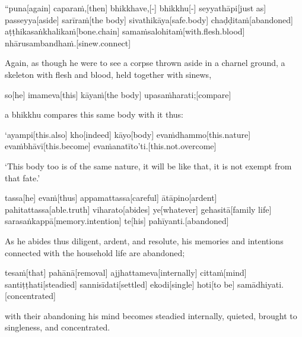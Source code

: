 \vskip 0.05in
\begin{samepage}
\begingl[glneveryline={\PaliGlossA,\PaliGlossB}]
“puna[again] caparaṁ,[then] bhikkhave,[-] bhikkhu[-] seyyathāpi[just as] passeyya[aside] sarīraṁ[the body] sivathikāya[safe.body] chaḍḍitaṁ[abandoned] aṭṭhikasaṅkhalikaṁ[bone.chain] samaṁsalohitaṁ[with.flesh.blood] nhārusambandhaṁ.[sinew.connect]
\endgl
\nopagebreak
\linespread{0.5}
\begin{spacin}{0.2}
{\PaliGlossFT Again, as though he were to see a corpse thrown aside in a charnel ground, a skeleton with flesh and blood, held together with sinews,}
\end{spacin}
\vskip 12pt
\end{samepage}
\begin{samepage}
\begingl[glneveryline={\PaliGlossA,\PaliGlossB}]
so[he] imameva[this] kāyaṁ[the body] upasaṁharati;[compare]
\endgl
\nopagebreak
\linespread{0.5}
\begin{spacin}{0.2}
{\PaliGlossFT a bhikkhu compares this same body with it thus:}
\end{spacin}
\vskip 12pt
\end{samepage}
\begin{samepage}
\begingl[glneveryline={\PaliGlossA,\PaliGlossB}]
‘ayampi[this.also] kho[indeed] kāyo[body] evaṁdhammo[this.nature] evaṁbhāvī[this.become] evaṁanatīto’ti.[this.not.overcome]
\endgl
\nopagebreak
\linespread{0.5}
\begin{spacin}{0.2}
{\PaliGlossFT ‘This body too is of the same nature, it will be like that, it is not exempt from that fate.’}
\end{spacin}
\vskip 12pt
\end{samepage}
\begin{samepage}
\begingl[glneveryline={\PaliGlossA,\PaliGlossB}]
tassa[he] evaṁ[thus] appamattassa[careful] ātāpino[ardent] pahitattassa[able.truth] viharato[abides] ye[whatever] gehasitā[family life] sarasaṅkappā[memory.intention] te[his] pahīyanti.[abandoned]
\endgl
\nopagebreak
\linespread{0.5}
\begin{spacin}{0.2}
{\PaliGlossFT As he abides thus diligent, ardent, and resolute, his memories and intentions connected with the household life are abandoned;}
\end{spacin}
\vskip 12pt
\end{samepage}
\begin{samepage}
\begingl[glneveryline={\PaliGlossA,\PaliGlossB}]
tesaṁ[that] pahānā[removal] ajjhattameva[internally] cittaṁ[mind] santiṭṭhati[steadied] sannisīdati[settled] ekodi[single] hoti[to be] samādhiyati.[concentrated]
\endgl
\nopagebreak
\linespread{0.5}
\begin{spacin}{0.2}
{\PaliGlossFT with their abandoning his mind becomes steadied internally, quieted, brought to singleness, and concentrated.}
\end{spacin}
\vskip 12pt
\end{samepage}
